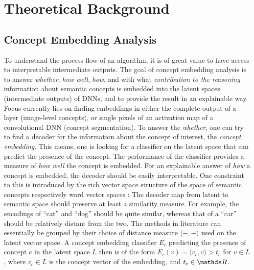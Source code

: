 \section{Theoretical Background}

\subsection{Concept Embedding Analysis}\label{sec:conceptanalysis}

To understand the process flow of an algorithm, it is of great value
to have access to interpretable intermediate outputs.
The goal of concept embedding analysis is to answer \emph{whether},
\emph{how well}, \emph{how}, and with what
\emph{contribution to the reasoning}
information about semantic concepts is embedded into the latent spaces
(intermediate outputs) of DNNs, and to provide the result in an
explainable way.
Focus currently lies on finding embeddings in either the complete
output of a layer (image-level concepts), or single pixels of an
activation map of a convolutional DNN (concept segmentation).
% 
To answer the \emph{whether}, one can try to find a decoder for the
information about the concept of interest, the \emph{concept embedding}.
This means, one is looking for a classifier on the latent space that
can predict the presence of the concept.
The performance of the classifier provides a measure of \emph{how well}
the concept is embedded.
% 
For an explainable answer of \emph{how} a concept is embedded, the
decoder should be easily interpretable.
One constraint to this is introduced by the rich vector space
structure of the space of semantic concepts respectively word vector spaces
\cite{mikolov_linguistic_2013}:
The decoder map from latent to semantic space should preserve at least
a similarity measure.
For example, the encodings of \enquote{cat} and \enquote{dog} should
be quite similar, whereas that of a \enquote{car} should be relatively
distant from the two.
The methods in literature can essentially be grouped by their choice
of distance measure $\langle -,-\rangle$ used on the latent vector space.
A concept embedding classifier $E_c$ predicting the presence of concept $c$
in the latent space $L$ then is of the form
$E_c(v)=\langle v_c,v\rangle > t_c$
for $v\in L$,
where $v_c\in L$ is the concept vector of the embedding,
and $t_c\in \R$.%

